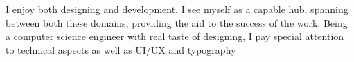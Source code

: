 \cventry{}
    {}
    {I enjoy both designing and development. I see myself as a capable hub, spanning between both these domains, providing the aid to the success of the work. Being a computer science engineer with real taste of designing, I pay special attention to technical aspects as well as UI/UX and typography}
    {}
    {}
    {}
    \vspace*{0.2\baselineskip}

